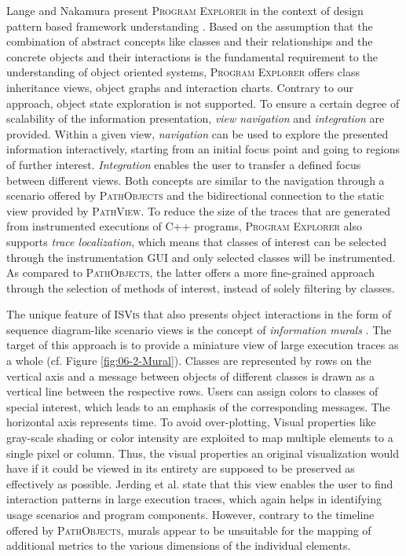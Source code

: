 Lange and Nakamura present \textsc{Program Explorer} in the context of design pattern based framework understanding \cite{lange_interactive_1995, lange_program_1995}.
Based on the assumption that the combination of abstract concepts like classes and their relationships and the concrete objects and their interactions is the fundamental requirement to the understanding of object oriented systems, \textsc{Program Explorer} offers class inheritance views, object graphs and interaction charts.
Contrary to our approach, object state exploration is not supported.
To ensure a certain degree of scalability of the information presentation, \emph{view navigation} and \emph{integration} are provided.
Within a given view, \emph{navigation} can be used to explore the presented information interactively, starting from an initial focus point and going to regions of further interest.
\emph{Integration} enables the user to transfer a defined focus between different views.
Both concepts are similar to the navigation through a scenario offered by \textsc{PathObjects} and the bidirectional connection to the static view provided by \textsc{PathView}.
To reduce the size of the traces that are generated from instrumented executions of C++ programs, \textsc{Program Explorer} also supports \emph{trace localization}, which means that classes of interest can be selected through the instrumentation GUI and only selected classes will be instrumented.
As compared to \textsc{PathObjects}, the latter offers a more fine-grained approach through the selection of methods of interest, instead of solely filtering by classes.

The unique feature of \textsc{ISVis} \cite{jerding_using_1997} that also presents object interactions in the form of sequence diagram-like scenario views is the concept of \emph{ information murals} \cite{jerding_information_1998, jerding_visualizing_1996}.
The target of this approach is to provide a miniature view of large execution traces as a whole (cf. Figure \ref{fig:06-2-Mural}).
Classes are represented by rows on the vertical axis and a message between objects of different classes is drawn as a vertical line between the respective rows.
Users can assign colors to classes of special interest, which leads to an emphasis of the corresponding messages.
The horizontal axis represents time.
To avoid over-plotting, Visual properties like gray-scale shading or color intensity are exploited to map multiple elements to a single pixel or column.
Thus, the visual properties an original visualization would have if it could be viewed in its entirety are supposed to be preserved as effectively as possible.
Jerding et al. state that this view enables the user to find interaction patterns in large execution traces, which again helps in identifying usage scenarios and program components.
However, contrary to the timeline offered by \textsc{PathObjects}, murals appear to be unsuitable for the mapping of additional metrics to the various dimensions of the individual elements.

